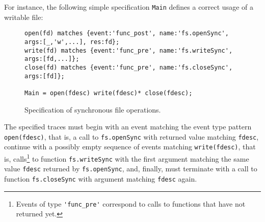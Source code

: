For instance, the following simple specification \lstinline{Main} defines a correct usage of a writable file:
\begin{figure}[h]
\begin{lstlisting}[basicstyle=\ttfamily\footnotesize]
open(fd) matches {event:'func_post', name:'fs.openSync', args:[_,'w',...], res:fd};
write(fd) matches {event:'func_pre', name:'fs.writeSync', args:[fd,...]};
close(fd) matches {event:'func_pre', name:'fs.closeSync', args:[fd]};

Main = open(fdesc) write(fdesc)* close(fdesc);
\end{lstlisting}
\caption{Specification of synchronous file operations.}\label{list:sync-fs}
\end{figure}
The specified traces must begin with an event matching the event type pattern \lstinline{open(fdesc)}, that is,
a call to \lstinline{fs.openSync} with returned value matching \lstinline{fdesc}, continue with a possibly empty sequence of events matching
\lstinline{write(fdesc)}, that is, calls\footnote{Events of type  \lstinline{'func_pre'}
correspond to calls to functions that have not returned yet.} to function \lstinline{fs.writeSync} with the first argument matching the same value \lstinline{fdesc}
returned by \lstinline{fs.openSync}, and, finally, must terminate with a call
to function \lstinline{fs.closeSync} with argument matching \lstinline{fdesc} again.


